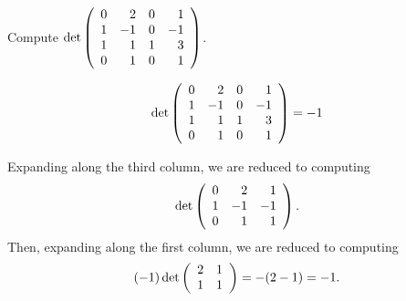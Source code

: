 \documentclass{ximera}
\author{Matthew Carr}
\begin{document}

\begin{exercise}\label{mc.exercise8}

Compute \quad $\det\left(\begin{array}{rrrrrrrrrrrrrrrrrr} 0 & 2 & 0 & 1\\ 1 & -1 & 0 & -1\\ 1 & 1 & 1& 3\\ 0 & 1 & 0 & 1 \end{array}\right)$.
  
\begin{solution}

\ans \[\det\left(\begin{array}{rrrrrrrrrrrrrrrrrr} 0 & 2 & 0 & 1\\ 1 & -1 & 0 & -1\\ 1 & 1 & 1& 3\\ 0 & 1 & 0 & 1 \end{array}\right)=-1\]

\soln Expanding along the third column, we are reduced to computing 
\[
\det\left(\begin{array}{rrrrrrrrrrrrrrrrrr} 0 & 2 & 1 \\ 1 & -1 & -1\\ 0 & 1 &  1 \end{array}\right)\ldotp
\]
Then, expanding along the first column, we are reduced to computing 
\[
(-1) \det \left(\begin{array}{rrrrrrrrrrrrrrrrrr} 2 & 1 \\ 1 & 1 \end{array}\right)=-(2-1)=-1\ldotp
\]
\end{solution}
\end{exercise}
\end{document}
